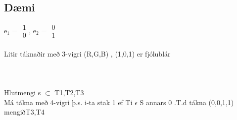 \documentclass[]{article}
\begin{document}
\subsection*{Dæmi}
e$ _{1} $ = $\begin{array}{|c|} 1 \\ 0 \end{array}$, e$ _{2} $ = $\begin{array}{|c|} 0 \\ 1 \end{array}$
\\
\\
Litir táknaðir með 3-vigri (R,G,B) , (1,0,1) er fjólublár\\\\
\\
\\
Hlutmengi s $\subset$ {T1,T2,T3}\\
Má tákna með 4-vigri þ.s. i-ta stak 1 ef Ti $\epsilon$ S annars 0 .T.d tákna (0,0,1,1) mengið{T3,T4}\\
\\
\\
\pagebreak
\end{document}
